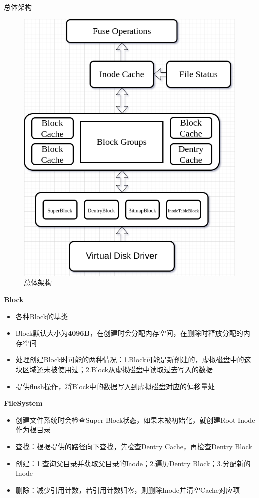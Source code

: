 \documentclass{beamer}
\begin{document}
\begin{frame}{总体架构}

\begin{figure}[htpb]
    \centering
    \includegraphics[width=0.5\linewidth]{pic/img.drawio.png}
    \caption{总体架构}
\end{figure}

\end{frame}

\begin{frame}{\textbf{Block}}
\begin{itemize}[<+-| alert@+>]
    \item 各种Block的基类
    \item Block默认大小为\textbf{4096B}，在创建时会分配内存空间，在删除时释放分配的内存空间
    \item 处理创建Block时可能的两种情况：1.Block可能是新创建的，虚拟磁盘中的这块区域还未被使用过；2.Block从虚拟磁盘中读取过去写入的数据
    \item 提供flush操作，将Block中的数据写入到虚拟磁盘对应的偏移量处
\end{itemize}
\end{frame}

\begin{frame}{\textbf{FileSystem}}
\begin{itemize}[<+-| alert@+>]
    \item 创建文件系统时会检查Super Block状态，如果未被初始化，就创建Root Inode作为根目录
    \item 查找：根据提供的路径向下查找，先检查Dentry Cache，再检查Dentry Block
    \item 创建：1.查询父目录并获取父目录的Inode；2.遍历Dentry Block；3.分配新的Inode
    \item 删除：减少引用计数，若引用计数归零，则删除Inode并清空Cache对应项
\end{itemize}
\end{frame}
\end{document}
